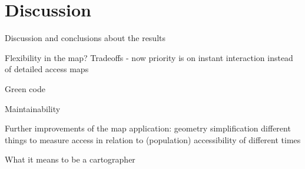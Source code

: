 \section{Discussion}

Discussion and conclusions about the results

Flexibility in the map? Tradeoffs - now priority is on instant interaction instead of detailed access maps

Green code

Maintainability

Further improvements of the map application:
geometry simplification
different things to measure access in relation to (population)
accessibility of different times

What it means to be a cartographer
